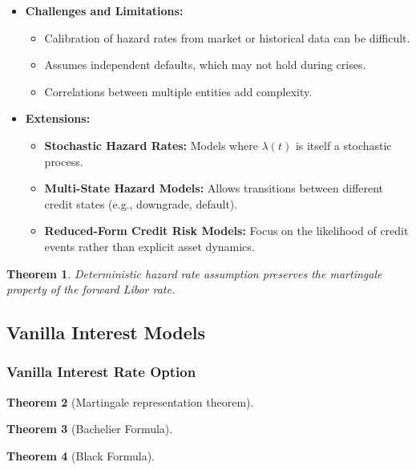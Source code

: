 \documentclass[a4paper,11pt]{book}
\newtheorem{theorem}{Theorem}[section]
\theoremstyle{definition}
\theoremstyle{remark}
\begin{document}
\begin{itemize}
    \item \textbf{Challenges and Limitations:}
    \begin{itemize}
        \item Calibration of hazard rates from market or historical data can be difficult.
        \item Assumes independent defaults, which may not hold during crises.
        \item Correlations between multiple entities add complexity.
    \end{itemize}
    
    \item \textbf{Extensions:}
    \begin{itemize}
        \item \textbf{Stochastic Hazard Rates:} Models where \(\lambda(t)\) is itself a stochastic process.
        \item \textbf{Multi-State Hazard Models:} Allows transitions between different credit states (e.g., downgrade, default).
        \item \textbf{Reduced-Form Credit Risk Models:} Focus on the likelihood of credit events rather than explicit asset dynamics.
    \end{itemize}
\end{itemize}


\begin{theorem}
	Deterministic hazard rate assumption preserves the martingale property of the forward Libor rate.
\end{theorem}


\subsection{Vanilla Interest Models}
\subsubsection{Vanilla Interest Rate Option}

\begin{theorem}[Martingale representation theorem]
\end{theorem}

\begin{theorem}[Bachelier Formula]	
\end{theorem}

\begin{theorem}[Black Formula]
\end{theorem}
\end{document}
